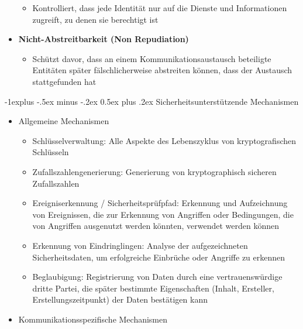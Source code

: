 \documentclass[a4paper]{article}
\makeatletter
\renewcommand{\subsection}{\@startsection{subsection}{2}{0mm}%
 {-1explus -.5ex minus -.2ex}%
 {0.5ex plus .2ex}%
 {\normalfont\normalsize\bfseries}}
\makeatother
\begin{document}
\begin{multicols}{3}
\begin{itemize}
              \begin{itemize}
                  \item
                        Kontrolliert, dass jede Identität nur auf die Dienste und
                        Informationen zugreift, zu denen sie berechtigt ist
              \end{itemize}
        \item
              \textbf{Nicht-Abstreitbarkeit (Non Repudiation)}

              \begin{itemize}
                  \item
                        Schützt davor, dass an einem Kommunikationsaustausch beteiligte
                        Entitäten später fälschlicherweise abstreiten können, dass der
                        Austausch stattgefunden hat
              \end{itemize}
    \end{itemize}


    \subsection{Sicherheitsunterstützende
        Mechanismen}

    \begin{itemize}
        \item
              Allgemeine Mechanismen

              \begin{itemize}
                  \item
                        Schlüsselverwaltung: Alle Aspekte des Lebenszyklus von
                        kryptografischen Schlüsseln
                  \item
                        Zufallszahlengenerierung: Generierung von kryptographisch sicheren
                        Zufallszahlen
                  \item
                        Ereigniserkennung / Sicherheitsprüfpfad: Erkennung und Aufzeichnung
                        von Ereignissen, die zur Erkennung von Angriffen oder Bedingungen,
                        die von Angriffen ausgenutzt werden könnten, verwendet werden können
                  \item
                        Erkennung von Eindringlingen: Analyse der aufgezeichneten
                        Sicherheitsdaten, um erfolgreiche Einbrüche oder Angriffe zu
                        erkennen
                  \item
                        Beglaubigung: Registrierung von Daten durch eine vertrauenswürdige
                        dritte Partei, die später bestimmte Eigenschaften (Inhalt,
                        Ersteller, Erstellungszeitpunkt) der Daten bestätigen kann
              \end{itemize}
        \item
              Kommunikationsspezifische Mechanismen


\end{itemize}
\end{multicols}
\end{document}
